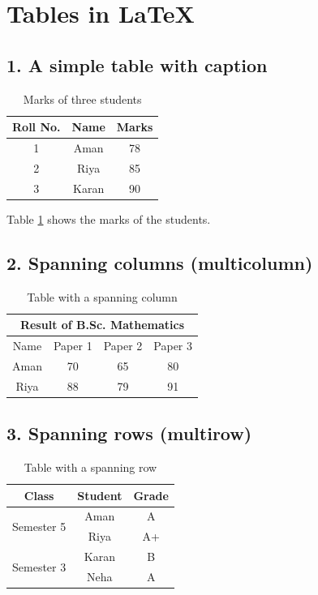 \documentclass[12pt]{article}
\begin{document}
\section*{Tables in \LaTeX{}}

\subsection*{1. A simple table with caption}
\begin{table}[h]
\centering
\begin{tabular}{|c|c|c|}
\hline
Roll No. & Name & Marks \\
\hline
1 & Aman & 78 \\
2 & Riya & 85 \\
3 & Karan & 90 \\
\hline
\end{tabular}
\caption{Marks of three students}
\label{tab:marks}
\end{table}

Table \ref{tab:marks} shows the marks of the students.

\subsection*{2. Spanning columns (multicolumn)}
\begin{table}[h]
\centering
\begin{tabular}{|c|c|c|c|}
\hline
\multicolumn{4}{|c|}{Result of B.Sc. Mathematics} \\
\hline
Name & Paper 1 & Paper 2 & Paper 3 \\
\hline
Aman & 70 & 65 & 80 \\
Riya & 88 & 79 & 91 \\
\hline
\end{tabular}
\caption{Table with a spanning column}
\end{table}

\subsection*{3. Spanning rows (multirow)}
\begin{table}[h]
\centering
\begin{tabular}{|c|c|c|}
\hline
Class & Student & Grade \\
\hline
\multirow{2}{*}{Semester 5} & Aman & A \\
\cline{2-3}
 & Riya & A+ \\
\hline
\multirow{2}{*}{Semester 3} & Karan & B \\
\cline{2-3}
 & Neha & A \\
\hline
\end{tabular}
\caption{Table with a spanning row}
\end{table}
\end{document}
